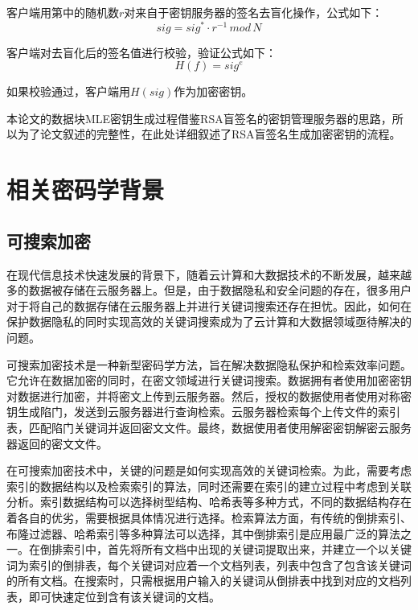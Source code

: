 \documentclass[promaster]{thesis-uestc}
\begin{document}
客户端用第中的随机数$r$对来自于密钥服务器的签名去盲化操作，公式如下：
\begin{equation}
    sig = sig^* \cdot r^{-1}\,mod\,N
\end{equation}

客户端对去盲化后的签名值进行校验，验证公式如下：
\begin{equation}
    H(f) = sig^e
\end{equation}

 如果校验通过，客户端用$H(sig)$作为加密密钥。

本论文的数据块MLE密钥生成过程借鉴RSA盲签名的密钥管理服务器的思路，所以为了论文叙述的完整性，在此处详细叙述了RSA盲签名生成加密密钥的流程。

\section{相关密码学背景}
\subsection{可搜索加密}
在现代信息技术快速发展的背景下，随着云计算和大数据技术的不断发展，越来越多的数据被存储在云服务器上。但是，由于数据隐私和安全问题的存在，很多用户对于将自己的数据存储在云服务器上并进行关键词搜索还存在担忧。因此，如何在保护数据隐私的同时实现高效的关键词搜索成为了云计算和大数据领域亟待解决的问题。

可搜索加密技术是一种新型密码学方法，旨在解决数据隐私保护和检索效率问题。它允许在数据加密的同时，在密文领域进行关键词搜索。数据拥有者使用加密密钥对数据进行加密，并将密文上传到云服务器。然后，授权的数据使用者使用对称密钥生成陷门，发送到云服务器进行查询检索。云服务器检索每个上传文件的索引表，匹配陷门关键词并返回密文文件。最终，数据使用者使用解密密钥解密云服务器返回的密文文件。

在可搜索加密技术中，关键的问题是如何实现高效的关键词检索。为此，需要考虑索引的数据结构以及检索索引的算法，同时还需要在索引的建立过程中考虑到关联分析。索引数据结构可以选择树型结构、哈希表等多种方式，不同的数据结构存在着各自的优劣，需要根据具体情况进行选择。检索算法方面，有传统的倒排索引、布隆过滤器、哈希索引等多种算法可以选择，其中倒排索引是应用最广泛的算法之一。在倒排索引中，首先将所有文档中出现的关键词提取出来，并建立一个以关键词为索引的倒排表，每个关键词对应着一个文档列表，列表中包含了包含该关键词的所有文档。在搜索时，只需根据用户输入的关键词从倒排表中找到对应的文档列表，即可快速定位到含有该关键词的文档。
\end{document}
